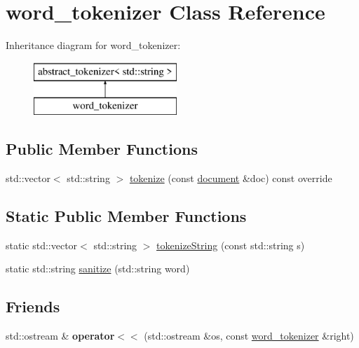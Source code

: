 \hypertarget{classword__tokenizer}{}\section{word\+\_\+tokenizer Class Reference}
\label{classword__tokenizer}
Inheritance diagram for word\+\_\+tokenizer\+:\begin{figure}[H]
\begin{center}
\leavevmode
\includegraphics[height=2.000000cm]{classword__tokenizer}
\end{center}
\end{figure}
\subsection*{Public Member Functions}
\begin{DoxyCompactItemize}
\item 
std\+::vector$<$ std\+::string $>$ \hyperlink{classword__tokenizer_ab0308f2cf9249f3c296307a055ee78df}{tokenize} (const \hyperlink{classdocument}{document} \&doc) const override
\end{DoxyCompactItemize}
\subsection*{Static Public Member Functions}
\begin{DoxyCompactItemize}
\item 
static std\+::vector$<$ std\+::string $>$ \hyperlink{classword__tokenizer_afa183b351b9322ed7a609796b56563cf}{tokenize\+String} (const std\+::string s)
\item 
static std\+::string \hyperlink{classword__tokenizer_ad214c1e5a60c0c0ea428f4a1df1ee4e0}{sanitize} (std\+::string word)
\end{DoxyCompactItemize}
\subsection*{Friends}
\begin{DoxyCompactItemize}
\item 
\mbox{\label{classword__tokenizer_ac1261a37f30d269708741936016b5f11}} 
std\+::ostream \& {\bfseries operator$<$$<$} (std\+::ostream \&os, const \hyperlink{classword__tokenizer}{word\+\_\+tokenizer} \&right)
\end{DoxyCompactItemize}


